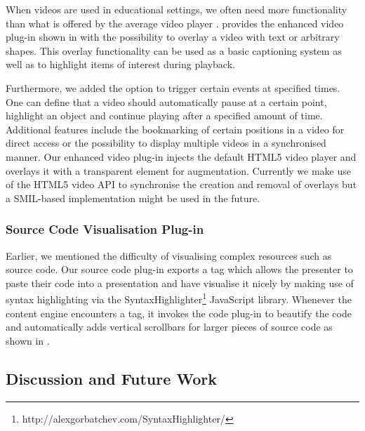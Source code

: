      When videos are used in educational settings, we often need more
     functionality than what is offered by the average video player
     \citep{reuss-1}. \mxp provides the enhanced video plug-in shown in
      with the possibility to overlay a video with text or
     arbitrary shapes. This overlay functionality can be used as a basic
     captioning system as well as to highlight items of interest during
     playback.

     Furthermore, we added the option to trigger certain events at specified
     times. One can define that a video should automatically pause at a certain
     point, highlight an object and continue playing after a specified amount
     of time. Additional features include the bookmarking of certain positions
     in a video for direct access or the possibility to display multiple videos
     in a synchronised manner. Our enhanced video plug-in injects the default
     HTML5 video player and overlays it with a transparent  element
     for augmentation. Currently we make use of the HTML5 video API to
     synchronise the creation and removal of overlays but a SMIL-based
     implementation might be used in the future.


    \subsubsection{Source Code Visualisation Plug-in}

     Earlier, we mentioned the difficulty of visualising complex resources such
     as source code. Our \mxp source code plug-in exports a  tag
     which allows the presenter to paste their code into a presentation and
     have \mxp visualise it nicely by making use of syntax highlighting via the
     SyntaxHighlighter\footnote{http://alexgorbatchev.com/SyntaxHighlighter/}
     JavaScript library. Whenever the content engine encounters a 
     tag, it invokes the code plug-in to beautify the code and automatically
     adds vertical scrollbars for larger pieces of source code as shown in
     .


   \subsection{Discussion and Future Work}

